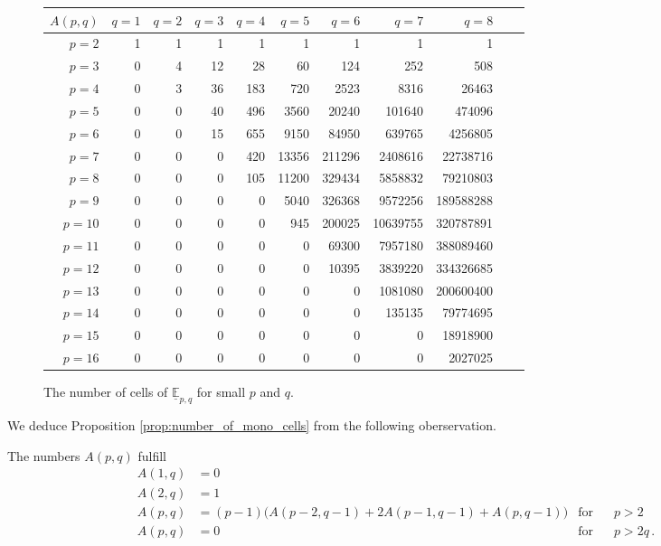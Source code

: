 \begin{figure}[ht]
\centering
\begin{tabular}{|r||r|r|r|r|r|r|r|r|r|r|}
    \hline
    $A(p,q)$ & $q=1$ & $q=2$ & $q=3$ & $q=4$ & $q=5$ & $q=6$ & $q=7$ & $q=8$ \\
    \hline
    \hline
    $p=2$ & 1 & 1 & 1 & 1 & 1 & 1 & 1 & 1 \\
    \hline
    $p=3$ & 0 & 4 & 12 & 28 & 60 & 124 & 252 & 508 \\
    \hline
    $p=4$ & 0 & 3 & 36 & 183 & 720 & 2523 & 8316 & 26463 \\
    \hline
    $p=5$ & 0 & 0 & 40 & 496 & 3560 & 20240 & 101640 & 474096 \\
    \hline
    $p=6$ & 0 & 0 & 15 & 655 & 9150 & 84950 & 639765 & 4256805 \\
    \hline
    $p=7$ & 0 & 0 & 0 & 420 & 13356 & 211296 & 2408616 & 22738716 \\
    \hline
    $p=8$ & 0 & 0 & 0 & 105 & 11200 & 329434 & 5858832 & 79210803 \\
    \hline
    $p=9$ & 0 & 0 & 0 & 0 & 5040 & 326368 & 9572256 & 189588288 \\
    \hline
    $p=10$ & 0 & 0 & 0 & 0 & 945 & 200025 & 10639755 & 320787891 \\
    \hline
    $p=11$ & 0 & 0 & 0 & 0 & 0 & 69300 & 7957180 & 388089460 \\
    \hline
    $p=12$ & 0 & 0 & 0 & 0 & 0 & 10395 & 3839220 & 334326685 \\
    \hline
    $p=13$ & 0 & 0 & 0 & 0 & 0 & 0 & 1081080 & 200600400 \\
    \hline
    $p=14$ & 0 & 0 & 0 & 0 & 0 & 0 & 135135 & 79774695 \\
    \hline
    $p=15$ & 0 & 0 & 0 & 0 & 0 & 0 & 0 & 18918900 \\
    \hline
    $p=16$ & 0 & 0 & 0 & 0 & 0 & 0 & 0 & 2027025 \\
    \hline
\end{tabular}
\caption{\label{complexity:table_number_of_cells_for_all_m}The number of cells of $\underline{\mathbb E}_{p,q}$ for small $p$ and $q$.}
\end{figure}

We deduce Proposition \ref{prop:number_of_mono_cells} from the following oberservation.

\begin{lem}
    \label{lem:Apq_recursion}
    The numbers $A(p,q)$ fulfill
    \begin{align}
        \label{CharA1q}         A(1,q) &= 0 \\
        \label{CharA2q}         A(2,q) &= 1 \\
        \label{CharApq}         A(p,q) &= (p-1) \big( A(p-2,q-1) + 2A(p-1,q-1) + A(p,q-1) \big) & \text{for} & \hspace{10pt} p > 2 \\
        \label{CharAp_ge_2q}    A(p,q) &= 0                                                     & \text{for} & \hspace{10pt} p > 2q \,.
    \end{align}
\end{lem}

